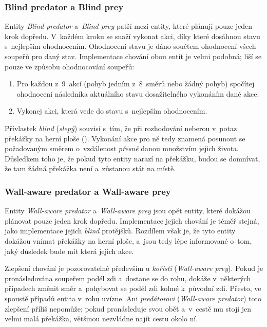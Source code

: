 \subsubsection*{Blind predator a Blind prey}

Entity \emph{Blind predator} a~\emph{Blind prey} patří mezi entity, které plánují pouze jeden krok dopředu. V~každém kroku se snaží vykonat akci, díky které dosáhnou stavu s~nejlepším ohodnocením. Ohodnocení stavu je dáno součtem ohodnocení všech soupeřů pro daný stav. Implementace chování obou entit je velmi podobná; liší se pouze ve způsobu ohodnocování soupeřů:
\begin{enumerate}
    \item Pro každou z~9~akcí (pohyb jedním z~8~směrů nebo žádný pohyb) spočítej ohodnocení následníka aktuálního stavu dosažitelného vykonáním dané akce.
    \item Vykonej akci, která vede do stavu s~nejlepším ohodnocením.
\end{enumerate}

Přívlastek \emph{blind} (\emph{slepý}) souvisí s~tím, že při rozhodování neberou v~potaz překážky na herní ploše (). Vykonání akce pro ně tedy znamená posunout se požadovaným směrem o~vzdálenost \emph{přesně} danou množstvím jejich života. Důsledkem toho je, že pokud tyto entity narazí na překážku, budou se domnívat, že tam žádná překážka není a~zůstanou stát na místě.

\subsubsection*{Wall-aware predator a Wall-aware prey}

Entity \emph{Wall-aware predator} a~\emph{Wall-aware prey} jsou opět entity, které dokážou plánovat pouze jeden krok dopředu. Implementace jejich chování je téměř stejná, jako implementace jejich \emph{blind} protějšků. Rozdílem však je, že tyto entity dokážou vnímat překážky na herní ploše, a~jsou tedy lépe informované o~tom, jaký důsledek bude mít která jejich akce.

Zlepšení chování je pozorovatelné především u \emph{kořisti} (\emph{Wall-aware prey}). Pokud je pronásledována soupeřem podél zdi a~dostane se do rohu, dokáže v~některých případech změnit směr a~pohybovat se podél zdi kolmé k~původní zdi. Přesto, ve spoustě případů entita v~rohu uvízne. Ani \emph{predátorovi} (\emph{Wall-aware predator}) toto zlepšení příliš nepomůže; pokud pronásleduje svou oběť a~v~cestě mu stojí jen velmi malá překážka, většinou nezvládne najít cestu okolo ní.

